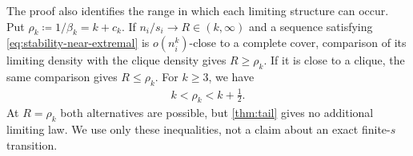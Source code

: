 The proof also identifies the range in which each limiting structure can occur. Put $\rho_k\coloneqq1/\beta_k=k+c_k$. If $n_i/s_i\to R\in(k,\infty)$ and a sequence satisfying \cref{eq:stability-near-extremal} is $o(n_i^k)$-close to a complete cover, comparison of its limiting density with the clique density gives $R\ge\rho_k$. If it is close to a clique, the same comparison gives $R\le\rho_k$. For $k\ge3$, we have
\begin{align}
k<\rho_k<k+\tfrac12.
\label{eq:matching-transition}
\end{align}
At $R=\rho_k$ both alternatives are possible, but \cref{thm:tail} gives no additional limiting law. We use only these inequalities, not a claim about an exact finite-$s$ transition.
